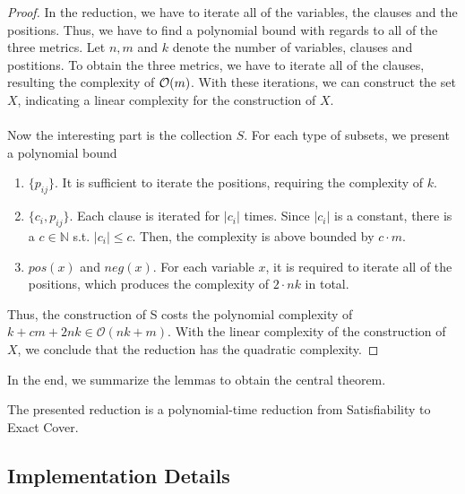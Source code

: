 \begin{proof}
    In the reduction, we have to iterate all of the variables, the clauses and the positions. 
    Thus, we have to find a polynomial bound with regards to all of the three metrics. Let $n, m$ and $k$ denote 
    the number of variables, clauses and postitions. To obtain the three metrics, we have to iterate 
    all of the clauses, resulting the complexity of $\mathcal{O}({m})$. With these iterations, we can construct the set $X$,
    indicating a linear complexity for the construction of $X$. \\\\
    Now the interesting part is the collection $S$. For each type of subsets, we present a polynomial bound 
\begin{enumerate}
    \item $\{p_{ij}\}$. It is sufficient to iterate the positions, requiring the complexity of $k$.
    \item $\{c_i, p_{ij}\}$. Each clause is iterated for $|c_i|$ times. Since $|c_i|$ is a constant, there is a $c \in \mathbb{N}$ 
    s.t. $|c_i| \leq c$. Then, the complexity is above bounded by $c \cdot m$.
    \item $pos(x)$ and $neg(x)$. For each variable $x$, it is required to iterate all of the positions, which produces the complexity 
    of $2 \cdot nk$ in total.
\end{enumerate}
Thus, the construction of S costs the polynomial complexity of $k + cm + 2nk \in \mathcal{O}(nk + m)$. 
With the linear complexity of the construction of $X$, we conclude that the reduction has the quadratic complexity.
\end{proof}
In the end, we summarize the lemmas to obtain the central theorem.
\begin{theorem}
    The presented reduction is a polynomial-time reduction from Satisfiability to Exact Cover.
\end{theorem}

\subsection{Implementation Details}
\label{sec:sat-imp}
